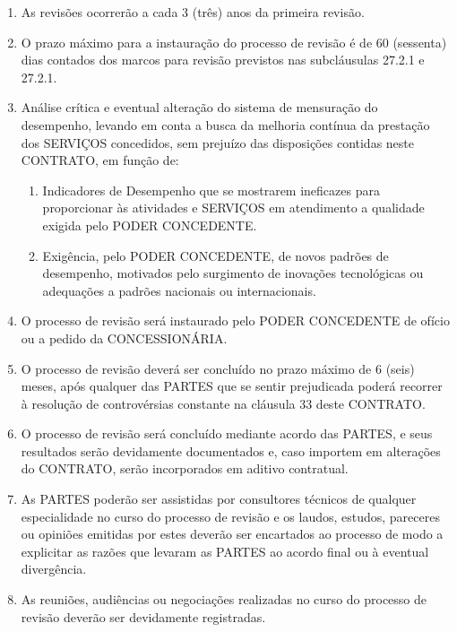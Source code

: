 \documentclass[a4paper,11pt]{report} %
\begin{document}
\begin{enumerate}
\begin{enumerate}[label*=\arabic*.]
\item \label{itm:DAUH} As revisões ocorrerão a cada 3 (três) anos da primeira revisão.

\item \label{itm:9RCV} O prazo máximo para a instauração do processo de revisão é de 60 (sessenta) dias contados dos marcos para revisão previstos nas subcláusulas 27.2.1 e 27.2.1.

\item \label{itm:6JGB} Análise crítica e eventual alteração do sistema de mensuração do desempenho, levando em conta a busca da melhoria contínua da prestação dos SERVIÇOS concedidos, sem prejuízo das disposições contidas neste CONTRATO, em função de:

\begin{enumerate}[label*=\arabic*.]
\item \label{itm:Q4TY} Indicadores de Desempenho que se mostrarem ineficazes para proporcionar às atividades e SERVIÇOS em atendimento a qualidade exigida pelo PODER CONCEDENTE.

\item \label{itm:V8QD} Exigência, pelo PODER CONCEDENTE, de novos padrões de desempenho, motivados pelo surgimento de inovações tecnológicas ou adequações a padrões nacionais ou internacionais.
\end{enumerate}

\item \label{itm:F88Z} O processo de revisão será instaurado pelo PODER CONCEDENTE de ofício ou a pedido da CONCESSIONÁRIA.

\item \label{itm:C7FY} O processo de revisão deverá ser concluído no prazo máximo de 6 (seis) meses, após qualquer das PARTES que se sentir prejudicada poderá recorrer à resolução de controvérsias constante na cláusula 33 deste CONTRATO.

\item \label{itm:SWFT} O processo de revisão será concluído mediante acordo das PARTES, e seus resultados serão devidamente documentados e, caso importem em alterações do CONTRATO, serão incorporados em aditivo contratual.

\item \label{itm:PQAQ} As PARTES poderão ser assistidas por consultores técnicos de qualquer especialidade no curso do processo de revisão e os laudos, estudos, pareceres ou opiniões emitidas por estes deverão ser encartados ao processo de modo a explicitar as razões que levaram as PARTES ao acordo final ou à eventual divergência.

\item \label{itm:F2XN} As reuniões, audiências ou negociações realizadas no curso do processo de revisão deverão ser devidamente registradas.
\end{enumerate}
\end{enumerate}
\end{document}
